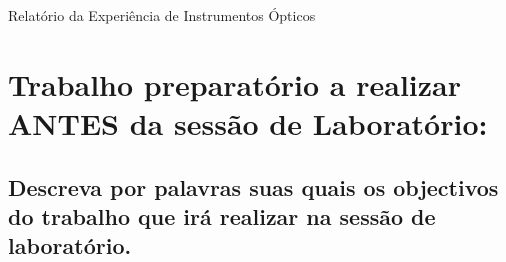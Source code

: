 \documentclass[a4paper,12pt]{article}  %
\author{Prof. Bernardo B. Carvalho}
\date{ Setembro 2015}
\newcommand{\HRule}{\rule{\linewidth}{0.5mm}}
\begin{document}
 



{  \sf  Relatório da Experiência de Instrumentos Ópticos} %




\section{\sf Trabalho preparatório a realizar  ANTES da sessão de Laboratório:}

\subsection{\sf  Descreva por palavras suas quais os objectivos do trabalho que irá realizar na sessão de laboratório.}


\noindent\underline{\makebox[\textwidth][r]{~}} \\
\noindent\underline{\makebox[\textwidth][r]{~}} \\
\noindent\underline{\makebox[\textwidth][r]{~}} \\
\noindent\underline{\makebox[\textwidth][r]{~}} \\
\noindent\underline{\makebox[\textwidth][r]{~}} \\
\noindent\underline{\makebox[\textwidth][r]{~}} \\
\noindent\underline{\makebox[\textwidth][r]{~}} \\

\end{document}

